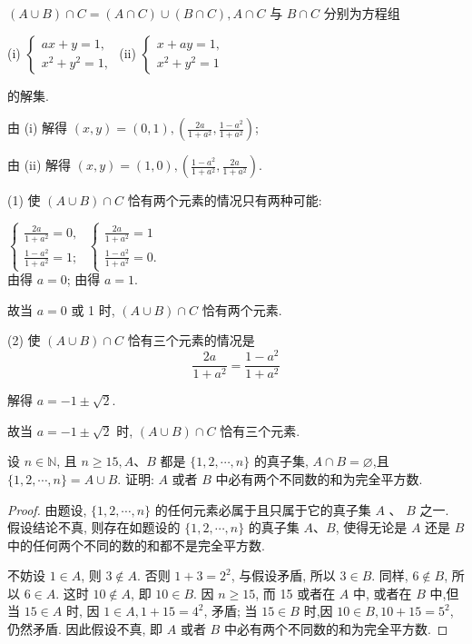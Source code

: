 \begin{solution}
	$(A \cup B) \cap C=(A \cap C) \cup(B \cap C), A \cap C$ 与 $B \cap C$ 分别为方程组

	(i) $\left\{\begin{array}{l}a x+y=1, \\ x^{2}+y^{2}=1,\end{array}\right.$
    \qquad
	(ii) $\left\{\begin{array}{l}x+a y=1, \\ x^{2}+y^{2}=1\end{array}\right.$
	
	的解集.

	由 (i) 解得 $(x, y)=(0,1),\left(\frac{2 a}{1+a^{2}}, \frac{1-a^{2}}{1+a^{2}}\right)$;

	由 (ii) 解得 $(x, y)=(1,0),\left(\frac{1-a^{2}}{1+a^{2}}, \frac{2 a}{1+a^{2}}\right)$.

	(1) 使 $(A \cup B) \cap C$ 恰有两个元素的情况只有两种可能:

	 $\left\{\begin{array}{l}\frac{2 a}{1+a^{2}}=0, \\ \frac{1-a^{2}}{1+a^{2}}=1 ;\end{array}\right.$
    \qquad
	 $\left\{\begin{array}{l}\frac{2 a}{1+a^{2}}=1 \\ \frac{1-a^{2}}{1+a^{2}}=0 .\end{array}\right.$\\
	由得 $a=0$; 由得 $a=1$.

	故当 $a=0$ 或 1 时, $(A \cup B) \cap C$ 恰有两个元素.

	(2) 使 $(A \cup B) \cap C$ 恰有三个元素的情况是
	$$
		\frac{2 a}{1+a^{2}}=\frac{1-a^{2}}{1+a^{2}}
	$$

	解得 $a=-1 \pm \sqrt{2}$.

	故当 $a=-1 \pm \sqrt{2}$ 时, $(A \cup B) \cap C$ 恰有三个元素.
\end{solution}

\begin{example}\label{ex:1.2.3}
	设 $n \in \mathbb{N}$, 且 $n \geqslant 15, A 、 B$ 都是 $\{1,2, \cdots, n\}$ 的真子集, $A \cap B=\varnothing$,且 $\{1,2, \cdots, n\}=A \cup B$. 证明: $A$ 或者 $B$ 中必有两个不同数的和为完全平方数.
\end{example}

\begin{proof}
	由题设, $\{1,2, \cdots, n\}$ 的任何元素必属于且只属于它的真子集 $A$ 、 $B$ 之一. 假设结论不真, 则存在如题设的 $\{1,2, \cdots, n\}$ 的真子集 $A 、 B$, 使得无论是 $A$ 还是 $B$ 中的任何两个不同的数的和都不是完全平方数.

	不妨设 $1 \in A$, 则 $3 \notin A$. 否则 $1+3=2^{2}$, 与假设矛盾, 所以 $3 \in B$. 同样, $6 \notin B$, 所以 $6 \in A$. 这时 $10 \notin A$, 即 $10 \in B$. 因 $n \geqslant 15$, 而 15 或者在 $A$ 中, 或者在 $B$ 中,但当 $15 \in A$ 时, 因 $1 \in A, 1+15=4^{2}$, 矛盾; 当 $15 \in B$ 时,因 $10 \in B, 10+15=5^{2}$, 仍然矛盾. 因此假设不真, 即 $A$ 或者 $B$ 中必有两个不同数的和为完全平方数.
\end{proof}

